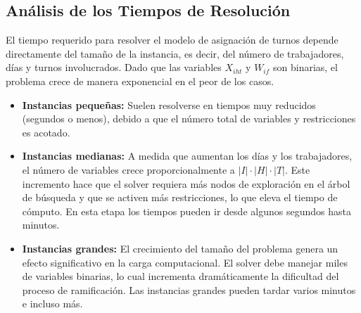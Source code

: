 \documentclass{article}
\begin{document}
\subsection*{Análisis de los Tiempos de Resolución}

El tiempo requerido para resolver el modelo de asignación de turnos depende directamente del tamaño de la instancia, es decir, del número de trabajadores, días y turnos involucrados. Dado que las variables $X_{iht}$ y $W_{if}$ son binarias, el problema crece de manera exponencial en el peor de los casos.

\begin{itemize}
    \item \textbf{Instancias pequeñas:}  
    Suelen resolverse en tiempos muy reducidos (segundos o menos), debido a que el número total de variables y restricciones es acotado.
    
    \item \textbf{Instancias medianas:}  
    A medida que aumentan los días y los trabajadores, el número de variables crece proporcionalmente a $|I|\cdot|H|\cdot|T|$.  
    Este incremento hace que el solver requiera más nodos de exploración en el árbol de búsqueda y que se activen más restricciones, lo que eleva el tiempo de cómputo.  
    En esta etapa los tiempos pueden ir desde algunos segundos hasta minutos.

    \item \textbf{Instancias grandes:}  
    El crecimiento del tamaño del problema genera un efecto significativo en la carga computacional.  
    El solver debe manejar miles de variables binarias, lo cual incrementa dramáticamente la dificultad del proceso de ramificación.
    Las instancias grandes pueden tardar varios minutos e incluso más.

\end{itemize}
\end{document}
